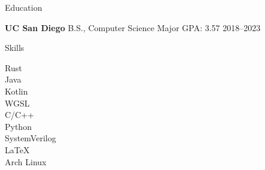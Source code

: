 


	\begin{rSection}{Education}

		{\bf UC San Diego} \hfill {B.S., Computer Science} \hfill {Major GPA: 3.57} \hfill {2018--2023}

	\end{rSection}

	\begin{rSection}{Skills}
		\begin{multicols}{5}
				Rust \\
				Java \\
				Kotlin \\
				WGSL \\
				C/C++ \\
				Python \\
				SystemVerilog \\
				\LaTeX \\
				Arch Linux
		\end{multicols}
	\end{rSection}

